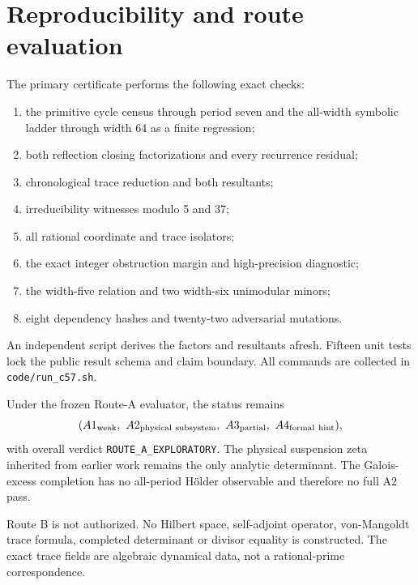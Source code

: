 \section{Reproducibility and route evaluation}

The primary certificate performs the following exact checks:
\begin{enumerate}
\item the primitive cycle census through period seven and the all-width
  symbolic ladder through width 64 as a finite regression;
\item both reflection closing factorizations and every recurrence residual;
\item chronological trace reduction and both resultants;
\item irreducibility witnesses modulo 5 and 37;
\item all rational coordinate and trace isolators;
\item the exact integer obstruction margin and high-precision diagnostic;
\item the width-five relation and two width-six unimodular minors;
\item eight dependency hashes and twenty-two adversarial mutations.
\end{enumerate}
An independent script derives the factors and resultants afresh.  Fifteen
unit tests lock the public result schema and claim boundary.  All commands
are collected in \texttt{code/run\_c57.sh}.

Under the frozen Route-A evaluator, the status remains
\[
 (A1_{\rm weak},\ A2_{\rm physical\ subsystem},\
 A3_{\rm partial},\ A4_{\rm formal\ hint}),
\]
with overall verdict \texttt{ROUTE\_A\_EXPLORATORY}.  The physical suspension
zeta inherited from earlier work remains the only analytic determinant.  The
Galois-excess completion has no all-period H\"older observable and therefore
no full A2 pass.

Route B is not authorized.  No Hilbert space, self-adjoint operator,
von-Mangoldt trace formula, completed determinant or divisor equality is
constructed.  The exact trace fields are algebraic dynamical data, not a
rational-prime correspondence.
